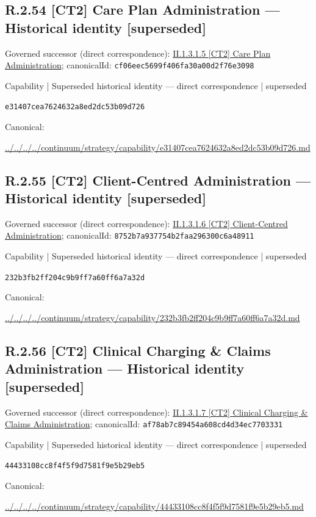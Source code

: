 \documentclass[10pt,a4paper]{article}
\begin{document}
\subsection*{R.2.54 [CT2] Care Plan Administration — Historical identity [superseded]}
Governed successor (direct correspondence): \hyperref[element-cf06eec5699f406fa30a00d2f76e3098]{II.1.3.1.5 [CT2] Care Plan Administration}; canonicalId: \texttt{cf06eec5699f406fa30a00d2f76e3098}\par
\label{element-e31407cea7624632a8ed2dc53b09d726}
{\small Capability | Superseded historical identity — direct correspondence | superseded}\par
\texttt{e31407cea7624632a8ed2dc53b09d726}\par
Canonical: \par
{\footnotesize\url{../../../../continuum/strategy/capability/e31407cea7624632a8ed2dc53b09d726.md}}\par
\subsection*{R.2.55 [CT2] Client-Centred Administration — Historical identity [superseded]}
Governed successor (direct correspondence): \hyperref[element-8752b7a937754b2faa296300c6a48911]{II.1.3.1.6 [CT2] Client-Centred Administration}; canonicalId: \texttt{8752b7a937754b2faa296300c6a48911}\par
\label{element-232b3fb2ff204c9b9ff7a60ff6a7a32d}
{\small Capability | Superseded historical identity — direct correspondence | superseded}\par
\texttt{232b3fb2ff204c9b9ff7a60ff6a7a32d}\par
Canonical: \par
{\footnotesize\url{../../../../continuum/strategy/capability/232b3fb2ff204c9b9ff7a60ff6a7a32d.md}}\par
\subsection*{R.2.56 [CT2] Clinical Charging \& Claims Administration — Historical identity [superseded]}
Governed successor (direct correspondence): \hyperref[element-af78ab7c89454a608cd4d34ec7703331]{II.1.3.1.7 [CT2] Clinical Charging \& Claims Administration}; canonicalId: \texttt{af78ab7c89454a608cd4d34ec7703331}\par
\label{element-44433108cc8f4f5f9d7581f9e5b29eb5}
{\small Capability | Superseded historical identity — direct correspondence | superseded}\par
\texttt{44433108cc8f4f5f9d7581f9e5b29eb5}\par
Canonical: \par
{\footnotesize\url{../../../../continuum/strategy/capability/44433108cc8f4f5f9d7581f9e5b29eb5.md}}\par
\end{document}
